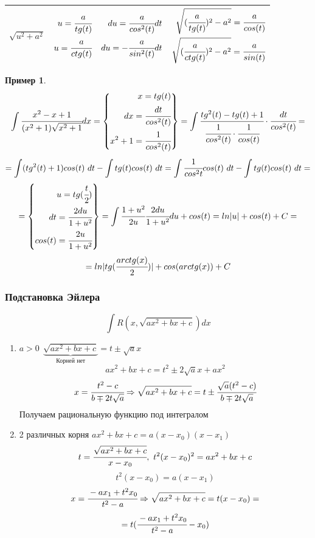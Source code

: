 \documentclass[a4paper]{article}
\theoremstyle{definition}
\newtheorem*{exmp}{Пример}
\newcommand\abs[1]{%
\mbox{$| #1 |$}}
\numberwithin{theorem}{subsection}
\numberwithin{lemma}{subsection}
\numberwithin{definition}{subsection}
\numberwithin{comment*}{subsection}
\numberwithin{consequence}{subsection}
\numberwithin{property}{subsection}
\begin{document}
\begin{center}
\begin{tabular}{ c c c c }
  \hline
  $\sqrt{u^2+a^2}$ & $\begin{aligned}
    u = \cfrac{a}{tg(t)}  \\
    u = \cfrac{a}{ctg(t)} \\
   \end{aligned}$ & $\begin{aligned}
    du = \cfrac{a}{cos^2 (t)} dt  \\
    du = -\cfrac{a}{sin^2 (t)} dt \\
   \end{aligned}$ & $\begin{aligned}
    \sqrt{(\cfrac{a}{tg(t)})^2 - a^2}=\cfrac{a}{cos(t)}  \\
    \sqrt{(\cfrac{a}{ctg(t)})^2 - a^2}=\cfrac{a}{sin(t)} \\
   \end{aligned}$ \\
  \hline
 \end{tabular}
\end{center}
\begin{exmp}
 $$ \int \cfrac{x^2-x+1}{(x^2+1)\sqrt{x^2+1}} dx= \left\{\!\begin{aligned}
   x = tg(t)                  \\
   dx = \cfrac{dt}{cos^2 (t)} \\
   x^2+1 = \cfrac{1}{cos^2 (t)}
  \end{aligned} \right\} = \int \cfrac{tg^2 (t) - tg (t) + 1}{\cfrac{1}{cos^2 (t)}\cdot \cfrac{1}{cos(t)}} \cdot \cfrac{dt}{cos^2 (t)} =$$
 $$ = \int (tg^2(t)+1)cos(t)\ dt - \int tg(t)cos(t)\ dt= \int \cfrac{1}{cos^2t}cos(t)\ dt - \int tg(t)cos(t)\ dt = $$
 $$=\left\{\!\begin{aligned}
   u = tg(\cfrac{t}{2})    \\
   dt = \cfrac{2du}{1+u^2} \\
   cos(t) = \cfrac{2u}{1+u^2}
  \end{aligned} \right\} = \int \cfrac{1+u^2}{2u} \cfrac{2du}{1+u^2} du + cos(t) = ln\abs{u}+cos(t) + C=$$
 $$=ln\abs{tg(\cfrac{arctg(x)}{2})} + cos(arctg(x)) + C$$
\end{exmp}
\subsubsection{Подстановка Эйлера}
$$ \int R(x, \sqrt{ax^2+bx+c}) dx $$
\begin{enumerate}
 \item $a>0\ \ \underbrace{\sqrt{ax^2+bx+c}}_{\text{Корней нет}}=t \pm \sqrt{a}x$
       $$ ax^2 + bx+ c = t^2 \pm 2\sqrt{a}x + ax^2$$
       $$ x = \cfrac{t^2-c}{b \mp 2t \sqrt{a}} \Rightarrow \sqrt{ax^2+bx+c}=t \pm \cfrac{\sqrt{a}(t^2-c)}{b\mp2t \sqrt{a}}$$
       Получаем рациональную функцию под интегралом
 \item 2 различных корня $ax^2+bx+c=a(x-x_0)(x-x_1)$
       $$ t = \cfrac{ \sqrt{ax^2+bx+c}}{x-x_0},\ t^2 (x-x_0)^2 = ax^2+bx+c$$
       $$ t^2(x-x_0) = a(x-x_1)$$
       $$ x = \cfrac{-ax_1 + t^2 x_0}{t^2 - a} \Rightarrow \sqrt{ax^2+bx+c} = t(x-x_0)=$$
       $$ = t(\cfrac{-ax_1 + t^2 x_0}{t^2 - a} - x_0)$$
\end{enumerate}
\end{document}
